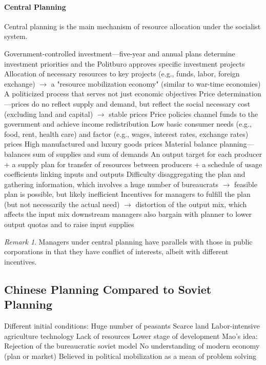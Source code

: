\documentclass[11pt]{article}
\theoremstyle{definition}
\theoremstyle{remark}
\newtheorem*{remark}{Remark}
\begin{document}
\paragraph{Central Planning} Central planning is the main mechanism of resource allocation under the socialist system.
\begin{outline}[enumerate]
\1 Government-controlled investment---five-year and annual plans determine investment priorities and the Politburo approves specific investment projects
	\2 Allocation of necessary resources to key projects (e.g., funds, labor, foreign exchange) $\to$ a "resource mobilization economy" (similar to war-time economies)
	\2 A politicized process that serves not just economic objectives
\1 Price determination---prices do no reflect supply and demand, but reflect the social necessary cost (excluding land and capital) $\to$ stable prices
	\2 Price policies channel funds to the government and achieve income redistribution
	\2 Low basic consumer needs (e.g., food, rent, health care) and factor (e.g., wages, interest rates, exchange rates) prices
	\2 High manufactured and luxury goods prices
\1 Material balance planning---balances sum of supplies and sum of demands
	\2 An output target for each producer + a supply plan for transfer of resources between producers + a schedule of usage coefficients linking inputs and outputs
	\2 Difficulty disaggregating the plan and gathering information, which involves a huge number of bureaucrats $\to$ feasible plan is possible, but likely inefficient
	\2 Incentives for managers to fulfill the plan (but not necessarily the actual need) $\to$ distortion of the output mix, which affects the input mix downstream
		\3 managers also bargain with planner to lower output quotas and to raise input supplies
\end{outline}

\begin{remark}
Managers under central planning have parallels with those in public corporations in that they have conflict of interests, albeit with different incentives.
\end{remark}

\subsection{Chinese Planning Compared to Soviet Planning}
\begin{outline}[enumerate]
\1 Different initial conditions:
	\2 Huge number of peasants
	\2 Scarce land
	\2 Labor-intensive agriculture technology
	\2 Lack of resources
	\2 Lower stage of development
\1 Mao's idea:
	\2 Rejection of the bureaucratic soviet model
	\2 No understanding of modern economy (plan or market)
	\2 Believed in political mobilization as a mean of problem solving
\end{outline}
\end{document}
